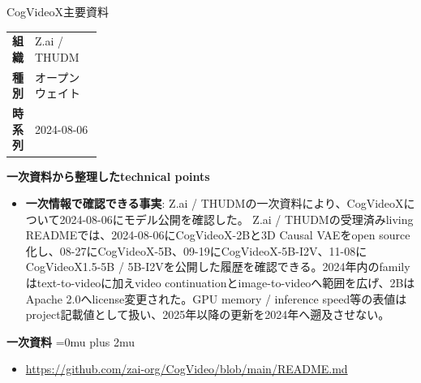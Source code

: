 \begin{technicalnote}{CogVideoX}{主要資料}
\begingroup
\begin{tabularx}{\linewidth}{@{}>{\bfseries}p{0.22\linewidth}X@{}}
組織 & Z.ai / THUDM \\
種別 & オープンウェイト \\
時系列 & 2024-08-06 \\
\end{tabularx}
\smallskip
{\bfseries 一次資料から整理したtechnical points}
\begin{itemize}[leftmargin=1.5em,itemsep=0.35em]
\item \textbf{一次情報で確認できる事実}: Z.ai / THUDMの一次資料により、CogVideoXについて2024-08-06にモデル公開を確認した。 Z.ai / THUDMの受理済みliving READMEでは、2024-08-06にCogVideoX-2Bと3D Causal VAEをopen source化し、08-27にCogVideoX-5B、09-19にCogVideoX-5B-I2V、11-08にCogVideoX1.5-5B / 5B-I2Vを公開した履歴を確認できる。2024年内のfamilyはtext-to-videoに加えvideo continuationとimage-to-videoへ範囲を広げ、2BはApache 2.0へlicense変更された。GPU memory / inference speed等の表値はproject記載値として扱い、2025年以降の更新を2024年へ遡及させない。
\end{itemize}
\begin{minipage}{\linewidth}
\begin{samepage}
{\bfseries 一次資料}
\begingroup\sloppy
\Urlmuskip=0mu plus 2mu\relax
\begin{itemize}[leftmargin=1.5em,itemsep=0.25em]
\item {\scriptsize\url{https://github.com/zai-org/CogVideo/blob/main/README.md}}
\end{itemize}
\endgroup
\end{samepage}
\end{minipage}
\endgroup
\end{technicalnote}
\medskip


